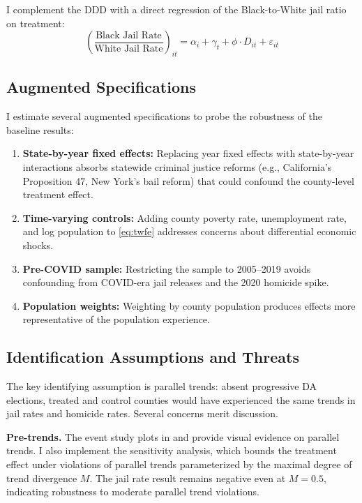 \documentclass[12pt]{article}
\begin{document}
I complement the DDD with a direct regression of the Black-to-White jail ratio on treatment:
\begin{equation}
\left(\frac{\text{Black Jail Rate}}{\text{White Jail Rate}}\right)_{it} = \alpha_i + \gamma_t + \phi \cdot D_{it} + \varepsilon_{it}
\label{eq:ratio}
\end{equation}

\subsection{Augmented Specifications}

I estimate several augmented specifications to probe the robustness of the baseline results:

\begin{enumerate}
\item \textbf{State-by-year fixed effects:} Replacing year fixed effects with state-by-year interactions absorbs statewide criminal justice reforms (e.g., California's Proposition 47, New York's bail reform) that could confound the county-level treatment effect.

\item \textbf{Time-varying controls:} Adding county poverty rate, unemployment rate, and log population to \eqref{eq:twfe} addresses concerns about differential economic shocks.

\item \textbf{Pre-COVID sample:} Restricting the sample to 2005--2019 avoids confounding from COVID-era jail releases and the 2020 homicide spike.

\item \textbf{Population weights:} Weighting by county population produces effects more representative of the population experience.
\end{enumerate}

\subsection{Identification Assumptions and Threats}

The key identifying assumption is parallel trends: absent progressive DA elections, treated and control counties would have experienced the same trends in jail rates and homicide rates. Several concerns merit discussion.

\textbf{Pre-trends.} The event study plots in  and  provide visual evidence on parallel trends. I also implement the \citet{rambachan2023honest} sensitivity analysis, which bounds the treatment effect under violations of parallel trends parameterized by the maximal degree of trend divergence $M$. The jail rate result remains negative even at $M = 0.5$, indicating robustness to moderate parallel trend violations.
\end{document}

